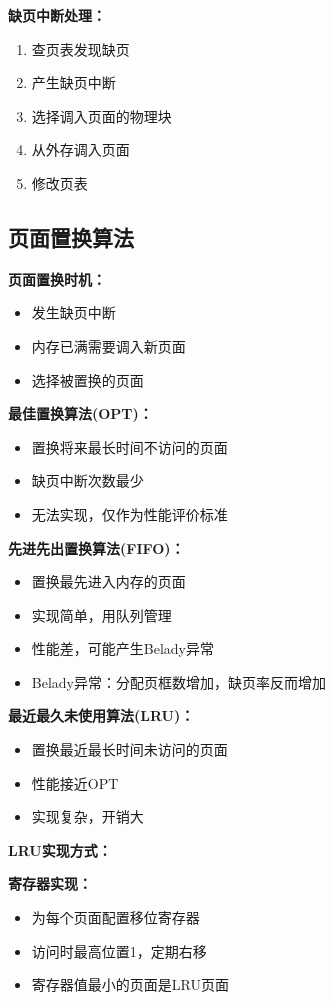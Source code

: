 \documentclass[lang=cn,newtx,10pt,scheme=chinese]{../../elegantbook}
\begin{document}
\textbf{缺页中断处理：}
\begin{enumerate}
  \item 查页表发现缺页
  \item 产生缺页中断
  \item 选择调入页面的物理块
  \item 从外存调入页面
  \item 修改页表
\end{enumerate}
\subsection{页面置换算法}

\textbf{页面置换时机：}
\begin{itemize}
  \item 发生缺页中断
  \item 内存已满需要调入新页面
  \item 选择被置换的页面
\end{itemize}

\textbf{最佳置换算法(OPT)：}
\begin{itemize}
  \item 置换将来最长时间不访问的页面
  \item 缺页中断次数最少
  \item 无法实现，仅作为性能评价标准
\end{itemize}

\textbf{先进先出置换算法(FIFO)：}
\begin{itemize}
  \item 置换最先进入内存的页面
  \item 实现简单，用队列管理
  \item 性能差，可能产生Belady异常
  \item Belady异常：分配页框数增加，缺页率反而增加
\end{itemize}

\textbf{最近最久未使用算法(LRU)：}
\begin{itemize}
  \item 置换最近最长时间未访问的页面
  \item 性能接近OPT
  \item 实现复杂，开销大
\end{itemize}

\textbf{LRU实现方式：}

\textbf{寄存器实现：}
\begin{itemize}
  \item 为每个页面配置移位寄存器
  \item 访问时最高位置1，定期右移
  \item 寄存器值最小的页面是LRU页面
\end{itemize}
\end{document}
